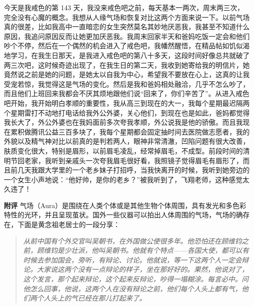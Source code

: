 \begin{case}
    今天是我戒色的第 143 天，我没来戒色吧之前，每天基本一两次，周末两三次，完全没有心魔的概念。我想从人缘气场和恢复对比这两个方面来说一下。以前气场真的很差，比如我高中一直暗恋的女生突然莫名其妙地厌恶我，我甚至不知道什么原因，我追问原因反而让她更加厌恶我。我周末回家半天和爸妈吃饭一定会和他们吵个不停，然后在一个偶然的机会进入了戒色吧，我幡然醒悟，在精品帖如饥似渴地学习，在我生日那天，是我进入戒色吧的第八十多天，这段时间好像总共就破了两三次吧，这时候奇迹出现了，在我生日的第二天，我收到她寄给我的明信片，她竟然说之前是她的问题，是她太以自我为中心，希望我不要放在心上，这真的让我受宠若惊，我觉得这是气场的变化。然后是我和爸妈相处融洽，几乎不怎么吵了，而且他们上班回来我都会不厌其烦地跟他们说“回来了，你们辛苦了”。从进入戒色吧开始，我开始明白孝顺的重要性，我从高三到现在的大一，我每个星期最迟隔两个星期雷打不动地打电话给我外公外婆，关心他们，到现在也是如此，爸妈都觉得我长大了，外公外婆也在我妈面前多次夸我孝顺，外公说我是他的骄傲。而且我现在累积做腾讯公益三百多块了，我每个星期都会固定抽时间去医院做志愿者，我的外貌以及精气神对比以前真的是判若两人，眼神非常清澈，凹陷问题有很大改善，肤质变化很大，特别是眉形，以前眉毛凌乱，经常掉眉毛，不成型。前段时间的清明节回老家，我听到亲戚头一次夸我眉毛很好看，我照镜子觉得眉毛有眉形了，而且前几天我跟大学里的一个老乡妹子打招呼，当我快离开的时候，我听到她旁边的一个女生小声地说：“他好帅，是你的老乡？”被我听到了，飞翔老师，这种感觉太久违了！

    \textbf{附评} 气场（Aura）是围绕在人类个体或是其他生物个体周围，具有发光和多色彩特性的光环，并且呈现茧状。国外一些仪器可以拍出人体周围的气场，气场的确存在，下面是黄念祖老居士的一段分享：

    \begin{quote}\it
        从前中国有个外交官叫吴朝书，在外国做公使很多年。他恐怕还在顾维钧之前，顾维钧是少壮派，他叫吴朝书。他就有个特点——各国大使，都可以有时候去参加国会，旁听，有辩论、讨论。他就说，等一下这两个人一定会辩论。大家说这两个没有一点辩论的样子，坐在那好好的。果然，他说对了，这个发言，那个起来辩论，这个起来反辩论，吵得一塌糊涂。每言必中。问他怎么回事，他说，这两个人在没有辩论之前，他们每个人头上都有气，他们两个人头上的气已经在那儿打起来了。
    \end{quote}


\end{case}
